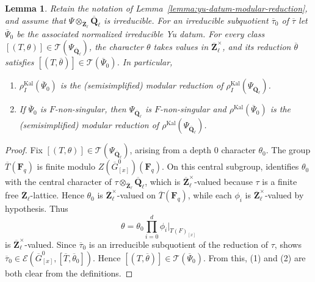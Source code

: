 \documentclass[reqno]{amsart}
\numberwithin{equation}{subsection}
\newcommand{\F}{\mathbf{F}}
\newcommand{\Q}{\mathbf{Q}}
\newcommand{\Z}{\mathbf{Z}}
\newcommand{\ol}[1]{\overline{#1}}
\newcommand\cE{\mathcal{E}}
\newcommand\cT{\mathcal{T}}
\DeclareMathOperator{\Kal}{Kal}
\newtheorem{lemma}[thm]{Lemma}
\theoremstyle{remark}
\numberwithin{equation}{subsection}
\numberwithin{figure}{subsection}
\begin{document}
\begin{lemma}\label{lemma:torus-character-modular-reduction}
Retain the notation of Lemma~\ref{lemma:yu-datum-modular-reduction}, and assume that $\Psi \otimes_{\ol\Z_\ell} \ol\Q_\ell$ is irreducible. For an irreducible subquotient $\ol\tau_0$ of $\ol\tau$ let $\ol\Psi_0$ be the associated normalized irreducible Yu datum. For every class $[(T,\theta)]\in\cT(\Psi_{\ol\Q_\ell})$, the character $\theta$ takes values in $\ol\Z_\ell^\times$, and its reduction $\ol\theta$ satisfies $[(T,\ol\theta)]\in\cT(\ol\Psi_0)$. In particular,
\begin{enumerate}
    \item $\rho_I^{\Kal}(\ol\Psi_0)$ is the (semisimplified) modular reduction of $\rho_I^{\Kal}(\Psi_{\ol\Q_\ell})$.
    \item If $\ol\Psi_0$ is $F$-non-singular, then $\Psi_{\ol\Q_\ell}$ is $F$-non-singular and $\rho^{\Kal}(\ol\Psi_0)$ is the (semisimplified) modular reduction of $\rho^{\Kal}(\Psi_{\ol\Q_\ell})$.
\end{enumerate}
\end{lemma}

\begin{proof}
Fix $[(T,\theta)]\in\cT(\Psi_{\ol\Q_\ell})$, arising from a depth $0$ character $\theta_0$. The group $\ol T(\F_q)$ is finite modulo $Z(\ol G^0_{[x]})(\F_q)$. On this central subgroup, \cite[Definition~2.8.2]{Cot26b} identifies $\theta_0$ with the central character of $\tau\otimes_{\ol\Z_\ell}\ol\Q_\ell$, which is $\ol\Z_\ell^\times$-valued because $\tau$ is a finite free $\ol\Z_\ell$-lattice. Hence $\theta_0$ is $\ol\Z_\ell^\times$-valued on $\ol T(\F_q)$, while each $\phi_i$ is $\ol\Z_\ell^\times$-valued by hypothesis. Thus
\[
\theta=\theta_0\prod_{i=0}^d\phi_i|_{T(F)_{[x]}}
\]
is $\ol\Z_\ell^\times$-valued. Since $\ol\tau_0$ is an irreducible subquotient of the reduction of $\tau$, \cite[Definition~2.8.2]{Cot26b} shows $\ol\tau_0 \in \cE(\ol G^0_{[x]}, [\ol T,\ol\theta_0])$. Hence $[(T,\ol\theta)]\in\cT(\ol\Psi_0)$. From this, (1) and (2) are both clear from the definitions.
\end{proof}
\end{document}
